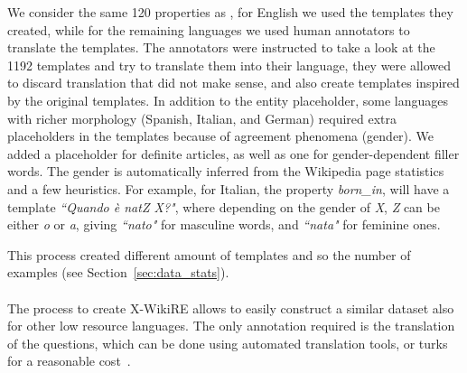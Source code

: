 We consider the same 120 properties as \cite{levy2017zero}, for English we used the templates they created, while for the remaining languages we used human annotators to translate the templates. The annotators were instructed to take a look at the 1192 templates and try to translate them into their language, they were allowed to discard translation that did not make sense, and also create templates inspired by the original templates. 
In  addition  to  the  entity placeholder, some languages with richer morphology  (Spanish,  Italian,  and  German)  required  extra placeholders in the templates because of agreement  phenomena  (gender).    We  added  a  placeholder  for  definite  articles,  as  well  as  one  for gender-dependent filler words. The gender is automatically inferred from the Wikipedia page statistics and a few heuristics. For example, for Italian, the property \textit{born\_in}, will have a template \textit{``Quando è natZ X?"}, where depending on the gender of \textit{X}, \textit{Z} can be either \textit{o} or \textit{a}, giving \textit{``nato"} for masculine words, and \textit{``nata"} for feminine ones.

This process created different amount of templates and so the number of examples (see Section~\ref{sec:data_stats}). 



\paragraph{}
The process to create X-WikiRE allows to easily construct a similar dataset also for other low resource languages. The only annotation required is the translation of the questions, which can be done using automated translation tools, or turks for a reasonable cost~\citep{levy2017zero}.


